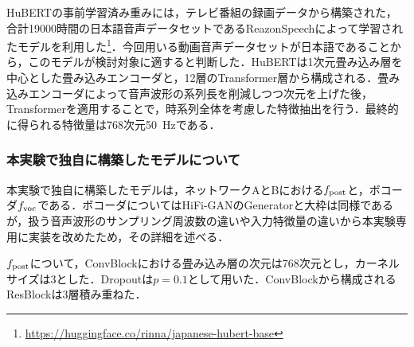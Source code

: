 HuBERTの事前学習済み重みには，テレビ番組の録画データから構築された，合計19000時間の日本語音声データセットであるReazonSpeech\cite{yin2023reazonspeech}によって学習されたモデル\cite{sawada2024release}を利用した\footnote{\url{https://huggingface.co/rinna/japanese-hubert-base}}．今回用いる動画音声データセットが日本語であることから，このモデルが検討対象に適すると判断した．HuBERTは1次元畳み込み層を中心とした畳み込みエンコーダと，12層のTransformer層から構成される．畳み込みエンコーダによって音声波形の系列長を削減しつつ次元を上げた後，Transformerを適用することで，時系列全体を考慮した特徴抽出を行う．最終的に得られる特徴量は768次元\SI{50}{\Hz}である．

\subsubsection{本実験で独自に構築したモデルについて}
本実験で独自に構築したモデルは，ネットワークAとBにおける$f_{\text{post}}$と，ボコーダ$f_{\text{voc}}$である．ボコーダについてはHiFi-GANのGeneratorと大枠は同様であるが，扱う音声波形のサンプリング周波数の違いや入力特徴量の違いから本実験専用に実装を改めたため，その詳細を述べる．

$f_{\text{post}}$について，ConvBlockにおける畳み込み層の次元は768次元とし，カーネルサイズは3とした．Dropoutは$p = 0.1$として用いた．ConvBlockから構成されるResBlockは3層積み重ねた．

